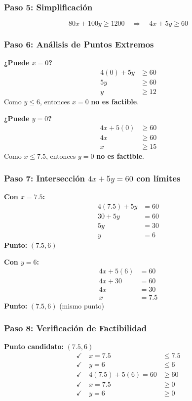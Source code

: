 \documentclass[12pt]{article}
\begin{document}
	\subsubsection*{Paso 5: Simplificación}
	\begin{equation}
		80x + 100y \geq 1200 \quad \Rightarrow \quad \boxed{4x + 5y \geq 60}
	\end{equation}
	
	\subsubsection*{Paso 6: Análisis de Puntos Extremos}
	\textbf{¿Puede $x = 0$?}
	\begin{align}
		4(0) + 5y &\geq 60\\
		5y &\geq 60\\
		y &\geq 12
	\end{align}
	Como $y \leq 6$, entonces $x = 0$ \textbf{no es factible}.
	
	\textbf{¿Puede $y = 0$?}
	\begin{align}
		4x + 5(0) &\geq 60\\
		4x &\geq 60\\
		x &\geq 15
	\end{align}
	Como $x \leq 7.5$, entonces $y = 0$ \textbf{no es factible}.
	
	\subsubsection*{Paso 7: Intersección $4x + 5y = 60$ con límites}
	\textbf{Con $x = 7.5$:}
	\begin{align}
		4(7.5) + 5y &= 60\\
		30 + 5y &= 60\\
		5y &= 30\\
		y &= 6
	\end{align}
	\textbf{Punto:} $(7.5, 6)$
	
	\textbf{Con $y = 6$:}
	\begin{align}
		4x + 5(6) &= 60\\
		4x + 30 &= 60\\
		4x &= 30\\
		x &= 7.5
	\end{align}
	\textbf{Punto:} $(7.5, 6)$ (mismo punto)
	
	\subsubsection*{Paso 8: Verificación de Factibilidad}
	\textbf{Punto candidato:} $(7.5, 6)$
	\begin{align}
		\checkmark \quad x = 7.5 &\leq 7.5\\
		\checkmark \quad y = 6 &\leq 6\\
		\checkmark \quad 4(7.5) + 5(6) = 60 &\geq 60\\
		\checkmark \quad x = 7.5 &\geq 0\\
		\checkmark \quad y = 6 &\geq 0
	\end{align}
	
\end{document}
